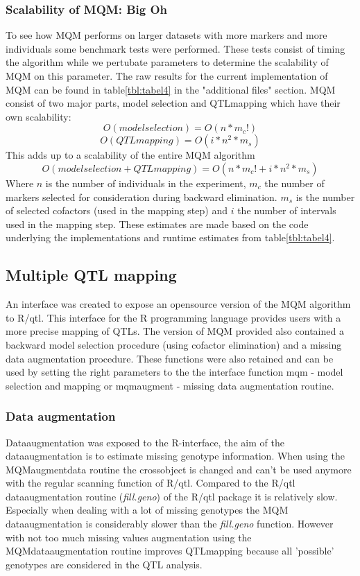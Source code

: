\subsubsection{Scalability of MQM: Big Oh}
To see how MQM performs on larger datasets with more markers and more individuals some benchmark
tests were performed. These tests consist of timing the algorithm while we pertubate parameters
to determine the scalability of MQM on this parameter. The raw results for the current implementation
of MQM can be found in table\ref{tbl:tabel4} in the "additional files" section. MQM consist of two major parts,
model selection and QTLmapping which have their own scalability:\\
\begin{equation}
O(model selection) = O(n*m_{c}!)
\end{equation}
\begin{equation}
O(QTLmapping) = O(i*n^2*m_{s})
\end{equation}
This adds up to a scalability of the entire MQM algorithm
\begin{equation}
O(model selection + QTLmapping) = O(n*m_{c}!+i*n^2*m_{s})
\end{equation}
Where $n$ is the number of individuals in the experiment, $m_{c}$ the number of markers selected for consideration during backward elimination.
$m_{s}$ is the number of selected cofactors (used in the mapping step) and $i$ the number of intervals used in the mapping step. These estimates 
are made based on the code underlying the implementations and runtime estimates from table\ref{tbl:tabel4}.
\subsection{Multiple QTL mapping}
An interface was created to expose an opensource version of the MQM algorithm to R/qtl. This interface for the R programming language provides users with a more precise mapping of QTLs. The version of MQM provided also contained a backward model selection procedure (using cofactor elimination) and a missing data augmentation procedure. These functions were also retained and can be used by setting the right parameters to the the interface function mqm - model selection and mapping or mqmaugment - missing data augmentation routine.
\subsubsection*{Data augmentation}
Dataaugmentation was exposed to the R-interface, the aim of the dataaugmentation is to estimate missing genotype information.
When using the MQMaugmentdata routine the crossobject is changed and can't be used anymore with the regular scanning function of R/qtl. 
Compared to the R/qtl dataaugmentation routine (\textit{fill.geno}) of the R/qtl package it is relatively slow. Especially when dealing with a lot of missing genotypes the MQM dataaugmentation is considerably slower than the \textit{fill.geno} function. 
However with not too much missing values augmentation using the MQMdataaugmentation routine improves 
QTLmapping because all 'possible' genotypes are considered in the QTL analysis.
